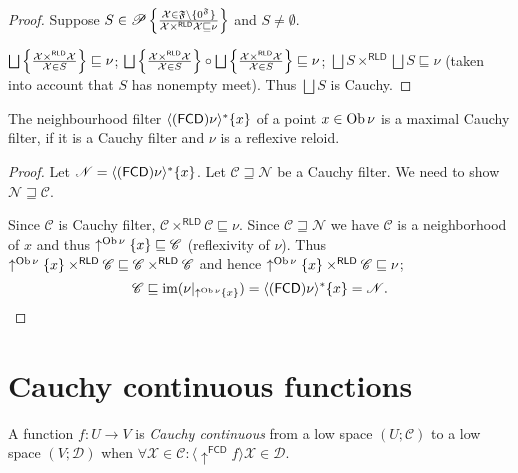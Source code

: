 \begin{proof}
  Suppose $S \in \mathscr{P} \left\{ \frac{ \mathcal{X} \in \mathfrak{F} \setminus \{
  0^{\mathfrak{F}} \}}{ \mathcal{X}
  \times^{\mathsf{RLD}} \mathcal{X} \sqsubseteq \nu }\right\}$ and $S
  \neq \emptyset$.
  
  $\bigsqcup \setcond{ \mathcal{X} \times^{\mathsf{RLD}} \mathcal{X}}
  {\mathcal{X} \in S } \sqsubseteq \nu$;
  $\bigsqcup \setcond{ \mathcal{X} \times^{\mathsf{RLD}} \mathcal{X}}
  {\mathcal{X} \in S } \circ \bigsqcup
  \setcond{ \mathcal{X} \times^{\mathsf{RLD}} \mathcal{X} }
  {\mathcal{X} \in S} \sqsubseteq \nu$; $\bigsqcup S
  \times^{\mathsf{RLD}} \bigsqcup S \sqsubseteq \nu$ (taken into
  account that $S$ has nonempty meet). Thus $\bigsqcup S$ is Cauchy.
\end{proof}

\begin{prop}
  The neighbourhood filter $\langle (\mathsf{FCD}) \nu \rangle^{\ast} \{
  x \}$ of a point $x \in \operatorname{Ob} \nu$ is a maximal Cauchy filter, if it is a
  Cauchy filter and $\nu$ is a reflexive reloid.
\end{prop}

\begin{proof}
  Let $\mathscr{N} = \langle (\mathsf{FCD}) \nu \rangle^{\ast} \{ x
  \}$. Let $\mathscr{C \sqsupseteq N}$ be a Cauchy filter. We need to show
  $\mathscr{N \sqsupseteq C}$.
  
  Since $\mathscr{C}$ is Cauchy filter, $\mathscr{C}
  \times^{\mathsf{RLD}} \mathscr{C} \sqsubseteq \nu$. Since $\mathscr{C
  \sqsupseteq N}$ we have $\mathscr{C}$ is a neighborhood of $x$ and thus
  $\uparrow^{\operatorname{Ob} \nu} \{ x \} \sqsubseteq \mathscr{C}$ (reflexivity of
  $\nu$). Thus $\uparrow^{\operatorname{Ob} \nu} \{ x \} \times^{\mathsf{RLD}}
  \mathscr{C} \sqsubseteq \mathscr{C} \times^{\mathsf{RLD}}
  \mathscr{C}$ and hence $\uparrow^{\operatorname{Ob} \nu} \{ x \}
  \times^{\mathsf{RLD}} \mathscr{C} \sqsubseteq \nu$;
  \[ \mathscr{C} \sqsubseteq \operatorname{im} (\nu |_{\uparrow^{\operatorname{Ob} \nu} \{ x
     \}}) = \langle (\mathsf{FCD}) \nu \rangle^{\ast} \{ x \} =
     \mathscr{N} . \]
\end{proof}

\section{Cauchy continuous functions}

\begin{defn}
  A function $f : U \rightarrow V$ is \emph{Cauchy continuous} from a low
  space $\left( U ; \mathscr{C} \right)$ to a low space
  $\left( V ; \mathscr{D} \right)$ when $\forall \mathcal{X} \in \mathscr{C} :
  \langle \uparrow^{\mathsf{FCD}} f \rangle \mathcal{X} \in
  \mathscr{D}$.
\end{defn}

